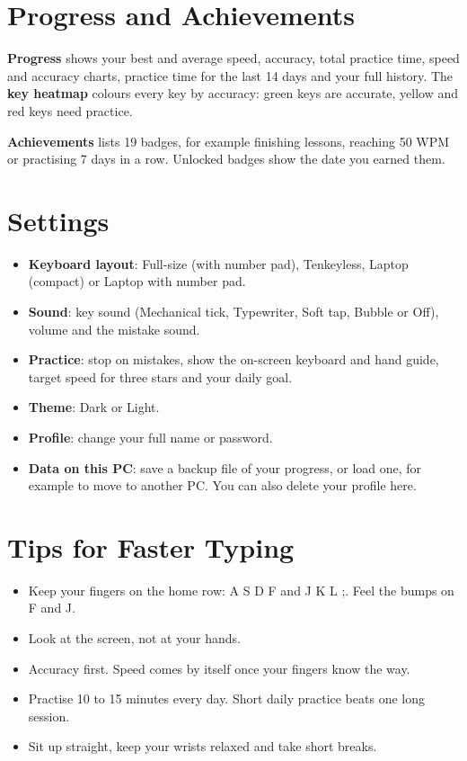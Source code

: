\chapter{Progress and Achievements}
\textbf{Progress} shows your best and average speed, accuracy, total practice time, speed and accuracy charts, practice time for the last 14 days and your full history.
The \textbf{key heatmap} colours every key by accuracy: green keys are accurate, yellow and red keys need practice.

\textbf{Achievements} lists 19 badges, for example finishing lessons, reaching 50 WPM or practising 7 days in a row. Unlocked badges show the date you earned them.

\chapter{Settings}
\begin{itemize}
\item \textbf{Keyboard layout}: Full-size (with number pad), Tenkeyless, Laptop (compact) or Laptop with number pad.
\item \textbf{Sound}: key sound (Mechanical tick, Typewriter, Soft tap, Bubble or Off), volume and the mistake sound.
\item \textbf{Practice}: stop on mistakes, show the on-screen keyboard and hand guide, target speed for three stars and your daily goal.
\item \textbf{Theme}: Dark or Light.
\item \textbf{Profile}: change your full name or password.
\item \textbf{Data on this PC}: save a backup file of your progress, or load one, for example to move to another PC. You can also delete your profile here.
\end{itemize}

\chapter{Tips for Faster Typing}
\begin{itemize}
\item Keep your fingers on the home row: A S D F and J K L ;. Feel the bumps on F and J.
\item Look at the screen, not at your hands.
\item Accuracy first. Speed comes by itself once your fingers know the way.
\item Practise 10 to 15 minutes every day. Short daily practice beats one long session.
\item Sit up straight, keep your wrists relaxed and take short breaks.
\end{itemize}


